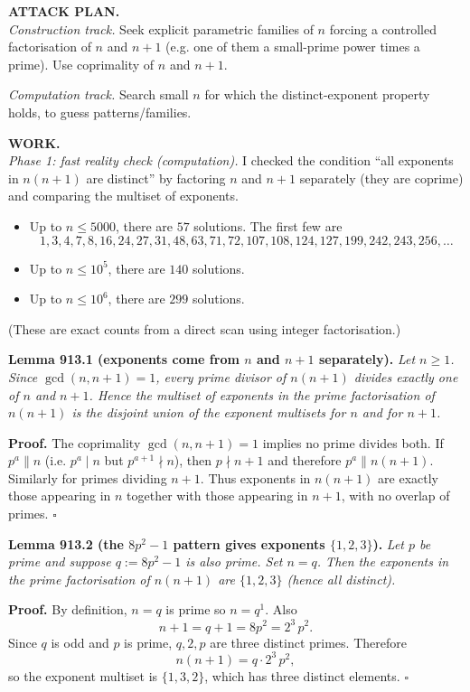 \medskip
\noindent\textbf{ATTACK PLAN.}\\
\emph{Construction track.} Seek explicit parametric families of $n$ forcing a controlled factorisation of $n$ and $n+1$ (e.g. one of them a small-prime power times a prime). Use coprimality of $n$ and $n+1$.

\smallskip
\noindent\emph{Computation track.} Search small $n$ for which the distinct-exponent property holds, to guess patterns/families.

\medskip
\noindent\textbf{WORK.}\\
\emph{Phase 1: fast reality check (computation).}  I checked the condition ``all exponents in $n(n+1)$ are distinct'' by factoring $n$ and $n+1$ separately (they are coprime) and comparing the multiset of exponents.

\begin{itemize}
\item Up to $n\le 5000$, there are $57$ solutions. The first few are
\[
1,3,4,7,8,16,24,27,31,48,63,71,72,107,108,124,127,199,242,243,256,\dots
\]
\item Up to $n\le 10^5$, there are $140$ solutions.
\item Up to $n\le 10^6$, there are $299$ solutions.
\end{itemize}
(These are exact counts from a direct scan using integer factorisation.)

\medskip
\noindent\textbf{Lemma 913.1 (exponents come from $n$ and $n+1$ separately).}  \emph{Let $n\ge 1$. Since $\gcd(n,n+1)=1$, every prime divisor of $n(n+1)$ divides exactly one of $n$ and $n+1$. Hence the multiset of exponents in the prime factorisation of $n(n+1)$ is the disjoint union of the exponent multisets for $n$ and for $n+1$.}

\noindent\textbf{Proof.} The coprimality $\gcd(n,n+1)=1$ implies no prime divides both. If $p^a\parallel n$ (i.e. $p^a\mid n$ but $p^{a+1}\nmid n$), then $p\nmid n+1$ and therefore $p^a\parallel n(n+1)$. Similarly for primes dividing $n+1$. Thus exponents in $n(n+1)$ are exactly those appearing in $n$ together with those appearing in $n+1$, with no overlap of primes. \hfill$\square$

\medskip
\noindent\textbf{Lemma 913.2 (the $8p^2-1$ pattern gives exponents $\{1,2,3\}$).}  \emph{Let $p$ be prime and suppose $q:=8p^2-1$ is also prime. Set $n=q$. Then the exponents in the prime factorisation of $n(n+1)$ are $\{1,2,3\}$ (hence all distinct).}

\noindent\textbf{Proof.} By definition, $n=q$ is prime so $n=q^1$. Also
\[
 n+1 = q+1 = 8p^2 = 2^3\,p^2.
\]
Since $q$ is odd and $p$ is prime, $q,2,p$ are three distinct primes. Therefore
\[
 n(n+1)= q\cdot 2^3\,p^2,
\]
so the exponent multiset is $\{1,3,2\}$, which has three distinct elements. \hfill$\square$

